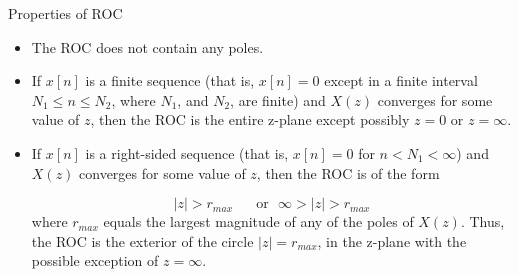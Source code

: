 \documentclass[aspectratio=169,xcolor=dvipsnames,svgnames,x11names,fleqn]{beamer}
\begin{document}
\begin{frame}{}
\vspace*{-9\baselineskip}
    \color{LightGray}{Blank space for calculation}
\end{frame}
\begin{frame}{}
\vspace*{-9\baselineskip}
    \color{LightGray}{Blank space for calculation}
\end{frame}
\begin{frame}{}
\vspace*{-9\baselineskip}
    \color{LightGray}{Blank space for calculation}
\end{frame}

\begin{frame}{}
\vspace*{-9\baselineskip}
    \color{LightGray}{Blank space for calculation}
\end{frame}

\begin{frame}{Properties of ROC}

    \begin{itemize}
        \item The ROC does not contain any poles. 
        \item If $x[n]$ is a finite sequence (that is, $x[n] = 0$ except in a finite interval $N_1 \leq n \leq N_2$, 
where $N_1$, and $N_2$, are finite) and $X(z)$ converges for some value of $z$, then the ROC is the entire z-plane except possibly $z = 0$ or $z = \infty$. 
\item If $x[n]$ is a right-sided sequence (that is, $x[n] = 0$ for $n < N_1 < \infty$) and $X(z)$ converges for some value of $z$, then the ROC is of the form 

$$
|z| > r_{max}\quad \textrm{~~or~~} \infty > |z| > r_{max}
$$
where $r_{max}$ equals the largest magnitude of any of the poles of $X(z)$. Thus, the ROC is the exterior of the circle $|z| = r_{max}$, in the z-plane with the possible exception of $z = \infty$.
    \end{itemize}
\end{frame}
\end{document}
